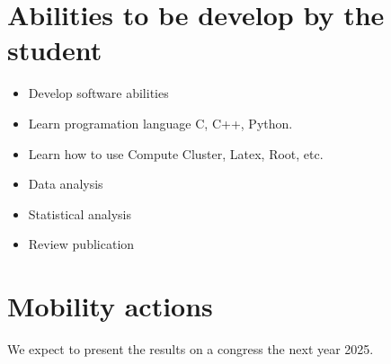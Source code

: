 \documentclass[final,12p]{article}
\begin{document}
\section{Abilities to be develop by the student}
\begin{itemize}
\item Develop software abilities
\item Learn programation language  C, C++, Python.
\item Learn how to use Compute Cluster, Latex, Root, etc.
\item Data analysis 
\item Statistical analysis
\item Review publication
\end{itemize}


\section{Mobility actions}
We expect to present the results on a congress the next year 2025. 
\end{document}
